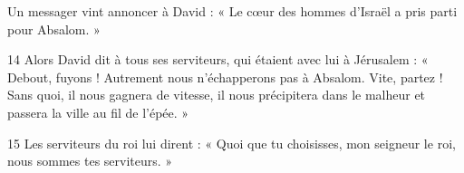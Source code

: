 Un messager vint annoncer à David : « Le cœur des hommes d’Israël a pris parti pour Absalom. »

14 Alors David dit à tous ses serviteurs, qui étaient avec lui à Jérusalem : « Debout, fuyons ! Autrement nous n’échapperons pas à Absalom. Vite, partez ! Sans quoi, il nous gagnera de vitesse, il nous précipitera dans le malheur et passera la ville au fil de l’épée. »

15 Les serviteurs du roi lui dirent : « Quoi que tu choisisses, mon seigneur le roi, nous sommes tes serviteurs. »
